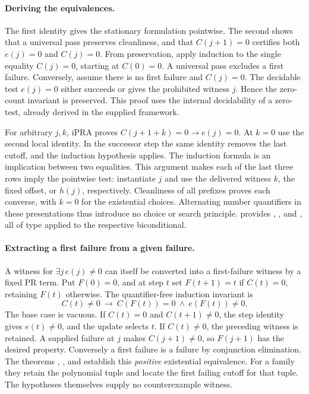 \paragraph{Deriving the equivalences.}
The first identity gives the stationary formulation pointwise. The second shows that a universal pass preserves cleanliness, and that \(C(j+1)=0\) certifies both \(e(j)=0\) and \(C(j)=0\). From preservation, apply induction to the single equality \(C(j)=0\), starting at \(C(0)=0\). A universal pass excludes a first failure. Conversely, assume there is no first failure and \(C(j)=0\). The decidable test \(e(j)=0\) either succeeds or gives the prohibited witness \(j\). Hence the zero-count invariant is preserved. This proof uses the internal decidability of a zero-test, already derived in the supplied framework.

For arbitrary \(j,k\), iPRA proves \(C(j+1+k)=0\to e(j)=0\). At \(k=0\) use the second local identity. In the successor step the same identity removes the last cutoff, and the induction hypothesis applies. The induction formula is an implication between two equalities. This argument makes each of the last three rows imply the pointwise test: instantiate \(j\) and use the delivered witness \(k\), the fixed offset, or \(h(j)\), respectively. Cleanliness of all prefixes proves each converse, with \(k=0\) for the existential choices. Alternating number quantifiers in these presentations thus introduce no choice or search principle.  provides , , and , all of type  applied to the respective biconditional.

\paragraph{Extracting a first failure from a given failure.}
A witness for \(\exists j\,e(j)\ne0\) can itself be converted into a first-failure witness by a fixed PR term. Put \(F(0)=0\), and at step \(t\) set \(F(t+1)=t\) if \(C(t)=0\), retaining \(F(t)\) otherwise. The quantifier-free induction invariant is
\[
 C(t)\ne0\ \longrightarrow\ C(F(t))=0\ \wedge\ e(F(t))\ne0.
\]
The base case is vacuous. If \(C(t)=0\) and \(C(t+1)\ne0\), the step identity gives \(e(t)\ne0\), and the update selects \(t\). If \(C(t)\ne0\), the preceding witness is retained. A supplied failure at \(j\) makes \(C(j+1)\ne0\), so \(F(j+1)\) has the desired property. Conversely a first failure is a failure by conjunction elimination. The theorems , , and  establish this \emph{positive} existential equivalence. For a family they retain the polynomial tuple and locate the first failing cutoff for that tuple. The hypotheses themselves supply no counterexample witness.
